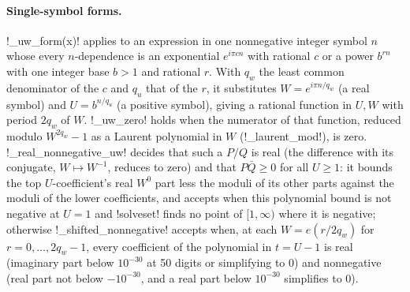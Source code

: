 \paragraph{Single-symbol forms.} \py!_uw_form(x)! applies to an expression in one nonnegative integer symbol $n$ whose every $n$-dependence is an exponential $e^{i\pi c n}$ with rational $c$ or a power $b^{rn}$ with one integer base $b>1$ and rational $r$. With $q_w$ the least common denominator of the $c$ and $q_u$ that of the $r$, it substitutes $W=e^{i\pi n/q_w}$ (a real symbol) and $U=b^{n/q_u}$ (a positive symbol), giving a rational function in $U,W$ with period $2q_w$ of $W$. \py!_uw_zero! holds when the numerator of that function, reduced modulo $W^{2q_w}-1$ as a Laurent polynomial in $W$ (\py!_laurent_mod!), is zero. \py!_real_nonnegative_uw! decides that such a $P/Q$ is real (the difference with its conjugate, $W\mapsto W^{-1}$, reduces to zero) and that $P\bar Q\ge0$ for all $U\ge1$: it bounds the top $U$-coefficient's real $W^0$ part less the moduli of its other parts against the moduli of the lower coefficients, and accepts when this polynomial bound is not negative at $U=1$ and \py!solveset! finds no point of $[1,\infty)$ where it is negative; otherwise \py!_shifted_nonnegative! accepts when, at each $W=e(r/2q_w)$ for $r=0,\ldots,2q_w-1$, every coefficient of the polynomial in $t=U-1$ is real (imaginary part below $10^{-30}$ at 50 digits or simplifying to $0$) and nonnegative (real part not below $-10^{-30}$, and a real part below $10^{-30}$ simplifies to $0$).

